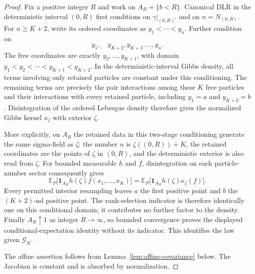 \documentclass[11pt,reqno]{amsart}
\numberwithin{equation}{section}
\theoremstyle{definition}
\theoremstyle{remark}
\newcommand{\E}{\mathbb E}
\newcommand{\1}{\mathbf 1}
\newcommand{\calG}{\mathcal G}
\begin{document}
\begin{proof}
Fix a positive integer $R$ and work on $A_R=\{b<R\}$. Canonical DLR
in the deterministic interval $(0,R)$ first conditions on
$\gamma|_{(0,R)^c}$ and on $n=N_{(0,R)}$. For $n\ge K+2$, write its
ordered coordinates as $y_1<\cdots<y_n$. Further condition on
\[
y_1,\quad y_{K+2},y_{K+3},\ldots,y_n.
\]
The free coordinates are exactly $y_2,\ldots,y_{K+1}$, with domain
$y_1<y_2<\cdots<y_{K+1}<y_{K+2}$. In the deterministic-interval Gibbs
density, all terms involving only retained particles are constant
under this conditioning. The remaining terms are precisely the pair
interactions among these $K$ free particles and their interactions
with every retained particle, including $y_1=a$ and $y_{K+2}=b$.
Disintegration of the ordered Lebesgue density therefore gives the
normalized Gibbs kernel $\kappa_\zeta$ with exterior $\zeta$.

More explicitly, on $A_R$ the retained data in this two-stage
conditioning generate the same sigma-field as $\zeta$: the number $n$
is $\zeta((0,R))+K$, the retained coordinates are the points of
$\zeta$ in $(0,R)$, and the deterministic exterior is also read from
$\zeta$. For bounded measurable $h$ and $f$, disintegration on each
particle-number sector consequently gives
\[
\E_P\bigl[\1_{A_R}h(\zeta)f(x_1,\ldots,x_K)\bigr]
=\E_P\bigl[\1_{A_R}h(\zeta)\kappa_\zeta(f)\bigr].
\]
Every permitted interior resampling leaves $a$ the first positive point
and $b$ the $(K+2)$-nd positive point. The rank-selection indicator is
therefore identically one on this conditional domain; it contributes
no further factor to the density. Finally $A_R\uparrow1$ as integer
$R\to\infty$, so bounded convergence proves the displayed
conditional-expectation identity without its indicator. This identifies
the law given $\calG_K$.

The affine assertion follows from Lemma~\ref{lem:affine-covariance}
below. The Jacobian is constant and is absorbed by normalization.
\end{proof}
\end{document}

